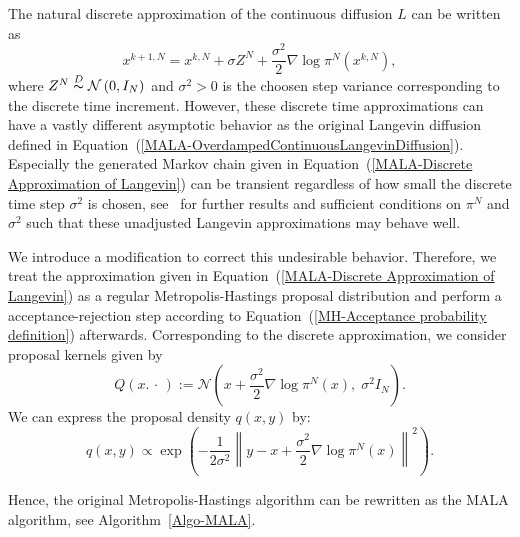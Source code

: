 The natural discrete approximation of the continuous diffusion $L$ can be written as
\begin{equation}
 \label{MALA-Discrete Approximation of Langevin}
 x^{k+1,N} = x^{k,N} + \sigma Z^N + \frac{\sigma^2}{2} \nabla \log \pi^{N} \left( x^{k,N} \right),  
\end{equation}
where $ Z^N \stackrel{D}{\thicksim} \mathcal{N}\left( 0, I_N \right) $ and $\sigma^2 > 0 $ is the choosen step variance corresponding to the discrete time increment. However, these discrete time approximations can have a vastly different asymptotic behavior as the original Langevin diffusion defined in Equation~(\ref{MALA-OverdampedContinuousLangevinDiffusion}). Especially the generated Markov chain given in Equation~(\ref{MALA-Discrete Approximation of Langevin}) can be transient regardless of how small the discrete time step $ \sigma^2 $ is chosen, see~\autocite[Theorem 3.2]{TweedieRoberts1996}  for further results and sufficient conditions on $ \pi^{N} $ and $ \sigma^2 $ such that these unadjusted Langevin approximations may behave well.

We introduce a modification to correct this undesirable behavior. Therefore, we treat the approximation given in Equation~(\ref{MALA-Discrete Approximation of Langevin}) as a regular Metropolis-Hastings proposal distribution and perform a acceptance-rejection step according to Equation~(\ref{MH-Acceptance probability definition}) afterwards. Corresponding to the discrete approximation, we consider proposal kernels given by
\begin{equation}
\label{MALA-GaussianProposalKernel}
 Q(x. \, \cdot \,) := \mathcal{N}(x + \frac{\sigma^2}{2} \nabla \log \pi^{N} \left( x \right),\; \sigma^2 I_{N} ).
\end{equation}
We can express the proposal density $ q(x,y) $ by:
\begin{equation}
\label{MALA - q(x,y)}
 q(x,y)  \varpropto  \exp{ \left( - \frac{ 1}{2 \sigma^2}  \left\| y - x + \frac{\sigma^2}{2} \nabla \log \pi^{N} \left( x \right) \right\|^2 \right) }.
\end{equation}

Hence, the original Metropolis-Hastings algorithm can be rewritten as the MALA algorithm, see Algorithm~\ref{Algo-MALA}.

